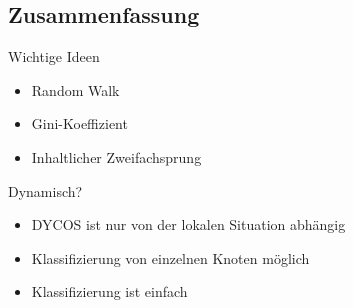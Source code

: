 \subsection{Zusammenfassung}
\begin{frame}{Wichtige Ideen}
    \begin{itemize}
        \item<1-> Random Walk
        \item<2-> Gini-Koeffizient
        \item<3-> Inhaltlicher Zweifachsprung
    \end{itemize}
\end{frame}

\begin{frame}{Dynamisch?}
    \begin{itemize}
        \item<1-> DYCOS ist nur von der lokalen Situation abhängig
        \item<2-> Klassifizierung von einzelnen Knoten möglich
        \item<3-> Klassifizierung ist einfach
    \end{itemize}
\end{frame}
